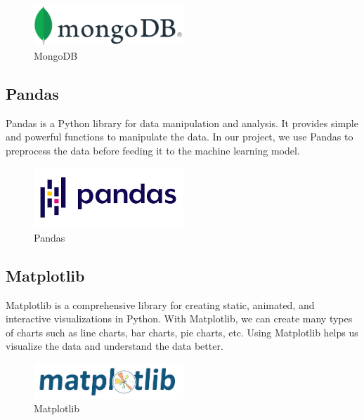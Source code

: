 \begin{figure}[ht]
    \centering
    \includegraphics[width=0.5\textwidth]{Images/8.Technology_Stack/mongodb_logo.png}
    \caption{MongoDB}
    \label{fig:mongodb}
\end{figure}


\subsection{Pandas}
Pandas is a Python library for data manipulation and analysis. It provides simple and powerful functions to manipulate the data. In our project, we use Pandas to preprocess the data before feeding it to the machine learning model.

\begin{figure}[ht]
    \centering
    \includegraphics[width=0.5\textwidth]{Images/8.Technology_Stack/pandas_logo.png}
    \caption{Pandas}
    \label{fig:pandas} 
\end{figure}

\subsection{Matplotlib}
Matplotlib is a comprehensive library for creating static, animated, and interactive visualizations in Python. With Matplotlib, we can create many types of charts such as line charts, bar charts, pie charts, etc. Using Matplotlib helps us visualize the data and understand the data better.

\begin{figure}[ht]
    \centering
    \includegraphics[width=0.5\textwidth]{Images/8.Technology_Stack/matplotlib_logo.png}
    \caption{Matplotlib}
    \label{fig:matplotlib}
\end{figure}

